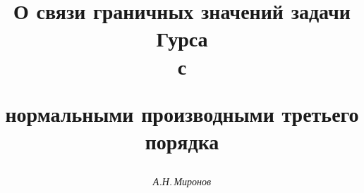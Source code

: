 









\newcommand{\tts}[1]{}







\setcounter{page}{23}















\author{\it А.Н.\,Миронов}




\title{О связи граничных значений задачи Гурса\\ с 


нормальными производными третьего порядка}





\date{}




\pagestyle{plain} %







\maketitle


\label{begin}





